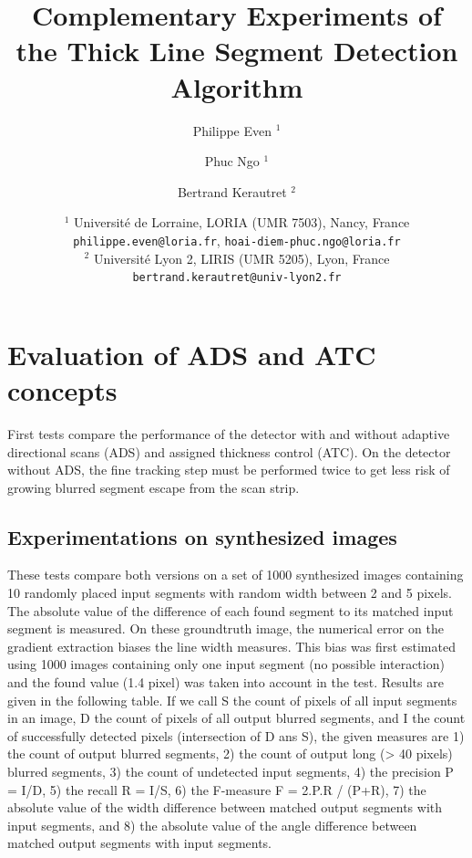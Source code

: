 \documentclass[11pt]{article}
\title{Complementary Experiments of the Thick Line Segment Detection Algorithm}
\date{
  $^1$ Universit\'e de Lorraine, LORIA (UMR 7503), Nancy, France \\
  \texttt{philippe.even@loria.fr},
  \texttt{hoai-diem-phuc.ngo@loria.fr}\\
  $^2$  Universit\'e Lyon 2, LIRIS (UMR 5205), Lyon, France\\
  \texttt{bertrand.kerautret@univ-lyon2.fr}}
\author{Philippe Even $^1$ \and Phuc Ngo $^1$ \and Bertrand Kerautret $^2$}
\begin{document}
\maketitle









\section{Evaluation of ADS and ATC concepts}
First tests compare the performance of the detector with and without
adaptive directional scans (ADS) and assigned thickness control (ATC).
On the detector without ADS, the fine tracking step must be performed
twice to get less risk of growing blurred segment escape from the scan
strip.



\subsection{Experimentations on synthesized images}
These tests compare both versions on a set of 1000 synthesized images containing
10 randomly placed input segments with random width between 2 and 5 pixels.
The absolute value of the difference of each found segment to its matched input segment is measured.
On these groundtruth image, the numerical error on the gradient extraction biases the line width measures.
This bias was first estimated using 1000 images containing only one input segment (no possible interaction) and the found value (1.4 pixel) was taken into account in the test.
Results are given in the following table.
If we call S the count of pixels of all input segments in an image, D the count of pixels of all output blurred segments, and I the count of successfully detected pixels (intersection of D ans S), the given measures are 1) the count of output blurred segments, 2) the count of output long (> 40 pixels) blurred segments, 3) the count of undetected input segments, 4) the precision P = I/D, 5) the recall R = I/S, 6) the F-measure F = 2.P.R / (P+R), 7) the absolute value of the width difference between matched output segments with input segments, and 8) the absolute value of the angle difference between matched output segments with input segments.
\end{document}
